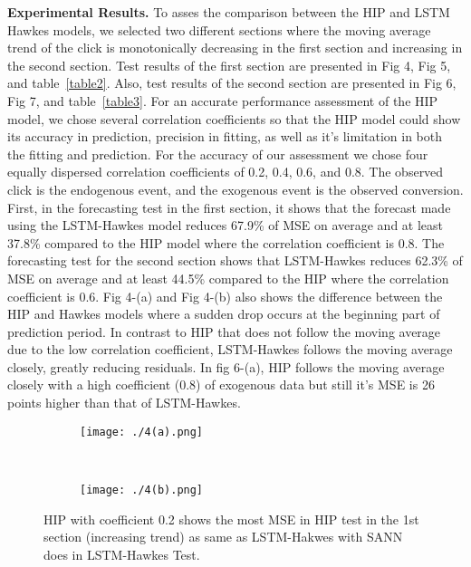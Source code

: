 \documentclass[10pt,letterpaper]{article}
\begin{document}
\textbf{Experimental Results.	} To asses the comparison between the HIP and LSTM Hawkes models, we selected two different sections where the moving average trend of the click is monotonically decreasing in the first section and increasing in the second section. Test results of the first section are presented in Fig 4, Fig 5, and table~\ref{table2}. Also, test results of the second section are presented in Fig 6, Fig 7, and table~\ref{table3}. For an accurate performance assessment of the HIP model, we chose several correlation coefficients so that the HIP model could show its accuracy in prediction, precision in fitting, as well as it's limitation in both the fitting and prediction. For the accuracy of our assessment we chose four equally dispersed correlation coefficients of 0.2, 0.4, 0.6, and 0.8. The observed click is the endogenous event, and the exogenous event is the observed conversion.  \\
First, in the forecasting test in the first section, it shows that the forecast made using the LSTM-Hawkes model reduces 67.9\% of 
MSE on average and at least 37.8\% compared to the HIP model where the correlation coefficient is 0.8. The forecasting test for the second section shows that LSTM-Hawkes reduces 62.3\% of MSE on average and at least 44.5\% compared to the HIP where the correlation coefficient is 0.6. Fig 4-(a) and Fig 4-(b) also shows the difference between the HIP and Hawkes models where a sudden drop occurs at the beginning part of prediction period. In contrast to HIP that does not follow the moving average due to the low correlation coefficient, LSTM-Hawkes follows the moving average closely, greatly reducing residuals. In fig 6-(a), HIP follows the moving average closely with a high coefficient (0.8) of exogenous data but still it's MSE is 26 points higher than that of LSTM-Hawkes. \\ 
\begin{figure}[h]
\begin{adjustwidth}{-2.25in}{0in} %
	\centering
	\begin{subfigure}[b]{0.43\paperwidth}\texttt{[image: ./4(a).png]}
\caption{}
	\label{4-(a)}
	\end{subfigure}
	~
	\begin{subfigure}[b]{0.43\paperwidth}\texttt{[image: ./4(b).png]}
	\caption{}
	\label{4-(b)}
	\end{subfigure}
\caption{{HIP with coefficient 0.2 shows the most MSE in HIP test in the 1st section (increasing trend) as same as LSTM-Hakwes with SANN does in LSTM-Hawkes Test. }}
\end{adjustwidth}
\label{fig4}
\end{figure}
\end{document}
